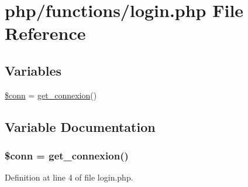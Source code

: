 \hypertarget{login_8php}{\section{php/functions/login.php File Reference}
\label{login_8php}
}
\subsection*{Variables}
\begin{DoxyCompactItemize}
\item 
\hyperlink{login_8php_aa8a5a87b9c1a6a0819b88447cbe41877}{\$conn} = \hyperlink{php__functions_8php_ace18bc10f3fd08f92688ac743e0d8c2e}{get\-\_\-connexion}()
\end{DoxyCompactItemize}


\subsection{Variable Documentation}
\hypertarget{login_8php_aa8a5a87b9c1a6a0819b88447cbe41877}{
\subsubsection[{\$conn}]{\setlength{\rightskip}{0pt plus 5cm}\$conn = {\bf get\-\_\-connexion}()}}\label{login_8php_aa8a5a87b9c1a6a0819b88447cbe41877}


Definition at line 4 of file login.\-php.

